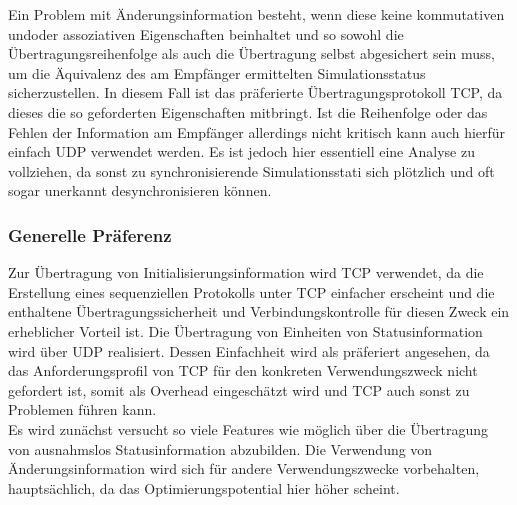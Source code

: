 \documentclass[11pt,twoside,a4paper]{article}
\begin{document}
\begin{enumerate}
Ein Problem mit Änderungsinformation besteht, wenn diese keine kommutativen und\/oder assoziativen Eigenschaften beinhaltet und so sowohl die Übertragungsreihenfolge als auch die Übertragung selbst abgesichert sein muss, um die Äquivalenz des am Empfänger ermittelten Simulationsstatus sicherzustellen. In diesem Fall ist das präferierte Übertragungsprotokoll TCP, da dieses die so geforderten Eigenschaften mitbringt. Ist die Reihenfolge oder das Fehlen der Information am Empfänger allerdings nicht kritisch kann auch hierfür einfach UDP verwendet werden. Es ist jedoch hier essentiell eine Analyse zu vollziehen, da sonst zu synchronisierende Simulationsstati sich plötzlich und oft sogar unerkannt desynchronisieren können.

\end{enumerate}

\subsubsection{Generelle Präferenz}
Zur Übertragung von Initialisierungsinformation wird TCP verwendet, da die Erstellung eines sequenziellen Protokolls unter TCP einfacher erscheint und die enthaltene Übertragungssicherheit und Verbindungskontrolle für diesen Zweck ein erheblicher Vorteil ist.
Die Übertragung von Einheiten von Statusinformation wird über UDP realisiert. Dessen Einfachheit wird als präferiert angesehen, da das Anforderungsprofil von TCP für den konkreten Verwendungszweck nicht gefordert ist, somit als Overhead eingeschätzt wird und TCP auch sonst zu Problemen führen kann.\\
Es wird zunächst versucht so viele Features wie möglich über die Übertragung von ausnahmslos Statusinformation abzubilden.
Die Verwendung von Änderungsinformation wird sich für andere Verwendungszwecke vorbehalten, hauptsächlich, da das Optimierungspotential hier höher scheint.
\end{document}
